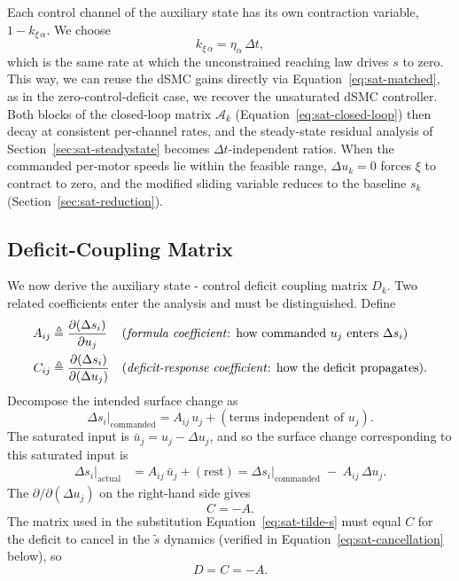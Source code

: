 \documentclass[conf]{new-aiaa}
\begin{document}
Each control channel of the auxiliary state has its own contraction variable, $1 - k_{\xi\,\alpha}$. We choose
\begin{equation}
\label{eq:sat-matched}
k_{\xi\, \alpha} = \eta_\alpha\, \Delta t,
\end{equation}
which is the same rate at which the unconstrained reaching law drives $s$ to zero. This way, we can reuse the dSMC gains directly via Equation~\ref{eq:sat-matched}, as in the zero-control-deficit case, we recover the unsaturated dSMC controller. Both blocks of the closed-loop matrix $\mathcal{A}_k$ (Equation~\ref{eq:sat-closed-loop}) then decay at consistent per-channel rates, and the steady-state residual analysis of Section~\ref{sec:sat-steadystate} becomes $\Delta t$-independent ratios. When the commanded per-motor speeds lie within the feasible range, $\Delta u_k = 0$ forces $\xi$ to contract to zero, and the modified sliding variable reduces to the baseline $s_k$ (Section~\ref{sec:sat-reduction}).

\subsection{Deficit-Coupling Matrix}
\label{sec:sat-deficit}

We now derive the auxiliary state - control deficit coupling matrix $D_k$. Two related coefficients enter the analysis and must be distinguished. Define
\begin{align}
\label{eq:sat-A-def}
A_{ij} &\triangleq \frac{\partial (\Delta s_i)}{\partial u_j}
&&\text{(\emph{formula coefficient}: how commanded $u_j$ enters $\Delta s_i$)} \\
\label{eq:sat-C-def}
C_{ij} &\triangleq \frac{\partial (\Delta s_i)}{\partial (\Delta u_j)}
&&\text{(\emph{deficit-response coefficient}: how the deficit propagates)}.
\end{align}
Decompose the intended surface change as
\begin{equation}
\Delta s_i \big|_{\mathrm{commanded}} = A_{ij}\, u_j + (\text{terms independent of } u_j).
\end{equation}
The saturated input is $\bar u_j = u_j - \Delta u_j$, and so the surface change corresponding to this saturated input is
\begin{align}
\Delta s_i \big|_{\mathrm{actual}}
&= A_{ij}\, \bar u_j + (\text{rest})
= \Delta s_i \big|_{\mathrm{commanded}} \;-\; A_{ij}\, \Delta u_j.
\end{align}
The $\partial / \partial (\Delta u_j)$ on the right-hand side gives
\begin{equation}
\label{eq:sat-C-equals-minusA}
C = -A.
\end{equation}
The matrix used in the substitution Equation~\ref{eq:sat-tilde-s} must equal $C$ for the deficit to cancel in the $\tilde s$ dynamics (verified in Equation~\ref{eq:sat-cancellation} below), so
\begin{equation}
\label{eq:sat-D-equals-C}
D = C = -A.
\end{equation}
\end{document}
